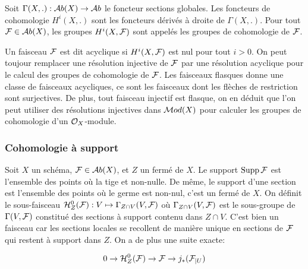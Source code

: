 \begin{defn}
Soit $\Gamma(X,.):\mathcal{A} b(X)\rightarrow \mathcal{A} b$ le foncteur sections globales. Les foncteurs de cohomologie $H^i(X,.)$ sont les foncteurs dérivés à droite de $\Gamma(X,.)$. Pour tout $\mathcal{F}\in \mathcal{A} b(X)$, les groupes $H^i(X,\mathcal{F})$ sont appelés les groupes de cohomologie de $\mathcal{F}$.
\end{defn}


Un faisceau $\mathcal{F}$ est dit acyclique si $H^i(X,\mathcal{F})$ est nul pour tout $i>0$. On peut toujour remplacer une résolution injective de $\mathcal{F}$ par une résolution acyclique pour le calcul des groupes de cohomologie de $\mathcal{F}$. Les faisceaux flasques donne une classe de faisceaux acycliques, ce sont les faisceaux dont les flèches de restriction sont surjectives. De plus, tout faisceau injectif est flasque, on en déduit que l'on peut utiliser des résolutions injectives dans $\mathcal{M} od(X)$ pour calculer les groupes de cohomologie d'un $\mathcal{O}_X$-module.

\subsubsection{Cohomologie à support}

Soit $X$ un schéma, $\mathcal{F}\in \mathcal{A} b(X)$, et $Z$ un fermé de $X$. Le support $\operatorname{Supp}\mathcal{F}$ est l'ensemble des points où la tige et non-nulle. De même, le support d'une section est l'ensemble des points où le germe est non-nul, c'est un fermé de $X$. On définit le sous-faisceau $\mathcal{H} ^0 _Z(\mathcal{F}):V\mapsto \Gamma_{Z\cap V}(V,\mathcal{F})$ où $\Gamma_{Z\cap V}(V,\mathcal{F})$ est le sous-groupe de $\Gamma(V,\mathcal{F})$ constitué des sections à support contenu dans $Z\cap V$. C'est bien un faisceau car les sections locales se recollent de manière unique en sections de $\mathcal{F}$ qui restent à support dans $Z$. On a de plus une suite exacte:


\begin{equation}\label{eq:ESSupport}
0\rightarrow \mathcal{H}^0 _Z(\mathcal{F}) \rightarrow \mathcal{F} \rightarrow j_*(\mathcal{F}_{|U})
\end{equation}

